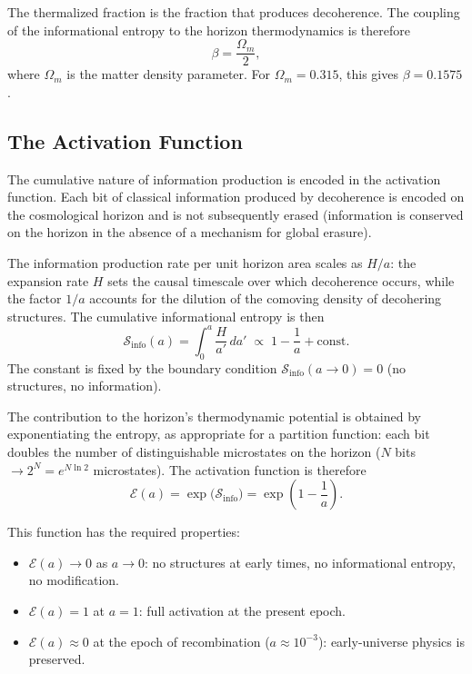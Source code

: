 \documentclass[11pt]{article}
\begin{document}
The thermalized fraction is the fraction that produces decoherence.  The
coupling of the informational entropy to the horizon thermodynamics is therefore
\begin{equation}
\beta = \frac{\Omega_m}{2},
\label{eq:beta}
\end{equation}
where $\Omega_m$ is the matter density parameter.  For $\Omega_m = 0.315$,
this gives $\beta = 0.1575$.

\subsection{The Activation Function}

The cumulative nature of information production is encoded in the activation
function.  Each bit of classical information produced by decoherence is
encoded on the cosmological horizon and is not subsequently erased (information
is conserved on the horizon in the absence of a mechanism for global erasure).

The information production rate per unit horizon area scales as $H/a$: the
expansion rate $H$ sets the causal timescale over which decoherence occurs,
while the factor $1/a$ accounts for the dilution of the comoving density of
decohering structures.  The cumulative informational entropy is then
\begin{equation}
\mathcal{S}_\mathrm{info}(a) = \int_0^a \frac{H}{a'}\,da'
\;\propto\; 1 - \frac{1}{a} + \text{const}.
\label{eq:sinfo_integral}
\end{equation}
The constant is fixed by the boundary condition
$\mathcal{S}_\mathrm{info}(a\to 0) = 0$ (no structures, no information).

The contribution to the horizon's thermodynamic potential is obtained by
exponentiating the entropy, as appropriate for a partition function:
each bit doubles the number of distinguishable microstates on the horizon
($N$ bits $\to 2^N = e^{N\ln 2}$ microstates).  The activation function is
therefore
\begin{equation}
\mathcal{E}(a) = \exp\!\bigl(\mathcal{S}_\mathrm{info}\bigr)
= \exp\!\left(1 - \frac{1}{a}\right).
\label{eq:activation}
\end{equation}

This function has the required properties:
\begin{itemize}
\item $\mathcal{E}(a) \to 0$ as $a \to 0$: no structures at early times, no
  informational entropy, no modification.
\item $\mathcal{E}(a) = 1$ at $a = 1$: full activation at the present epoch.
\item $\mathcal{E}(a) \approx 0$ at the epoch of recombination
  ($a \approx 10^{-3}$): early-universe physics is preserved.
\end{itemize}
\end{document}
